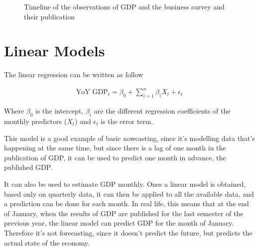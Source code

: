 \documentclass[12pt,a4paper,oneside]{book}
\newcommand{\ImageWidth}{11cm}
\begin{document}
\begin{figure}[!htp]
     \centering \footnotesize
{}
    \caption{Timeline of the observations of GDP and the business survey and their publication}
    \label{fig:time of the data}
\end{figure}


\section{Linear Models}

The linear regression can be written as follow

\begin{eqnarray}
    \text{YoY GDP}_{t} = \beta_0 + \sum^n_{i = 1}
       \beta_{i} X_{t} + \epsilon_t 
\end{eqnarray}

Where $\beta_{0}$ is the intercept, $\beta_{i}$ are the different regression coefficients of the monthly predictors ($X_{t}$) and $\epsilon_t$ is the error term.

This model is a good example of basic nowcasting, since it's modelling data that's happening at the same time, but since there is a lag of one month in the publication of GDP, it can be used to predict one month in advance, the published GDP.

It can also be used to estimate GDP monthly. Ones a linear model is obtained, based only on quarterly data, it can then be applied to all the available data, and a prediction can be done for each month.
In real life, this means that at the end of January, when the results of GDP are published for the last semester of the previous year, the linear model can predict GDP for the month of January. Therefore it's not forecasting, since it doesn't predict the future, but predicts the actual state of the economy.
\end{document}
